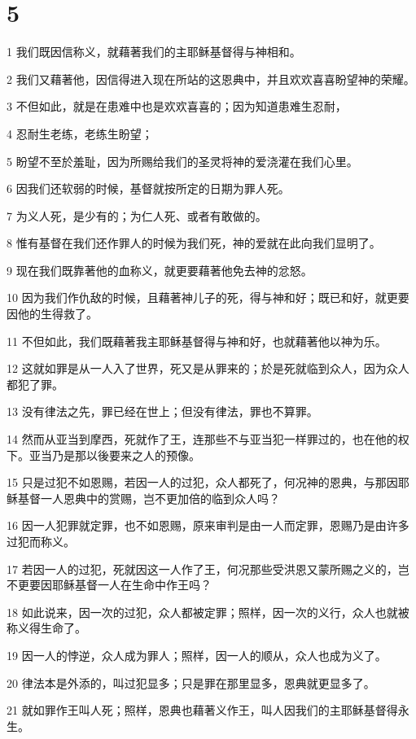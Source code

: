 \chapter{5}

\par 1 我们既因信称义，就藉著我们的主耶稣基督得与神相和。
\par 2 我们又藉著他，因信得进入现在所站的这恩典中，并且欢欢喜喜盼望神的荣耀。
\par 3 不但如此，就是在患难中也是欢欢喜喜的；因为知道患难生忍耐，
\par 4 忍耐生老练，老练生盼望；
\par 5 盼望不至於羞耻，因为所赐给我们的圣灵将神的爱浇灌在我们心里。
\par 6 因我们还软弱的时候，基督就按所定的日期为罪人死。
\par 7 为义人死，是少有的；为仁人死、或者有敢做的。
\par 8 惟有基督在我们还作罪人的时候为我们死，神的爱就在此向我们显明了。
\par 9 现在我们既靠著他的血称义，就更要藉著他免去神的忿怒。
\par 10 因为我们作仇敌的时候，且藉著神儿子的死，得与神和好；既已和好，就更要因他的生得救了。
\par 11 不但如此，我们既藉著我主耶稣基督得与神和好，也就藉著他以神为乐。
\par 12 这就如罪是从一人入了世界，死又是从罪来的；於是死就临到众人，因为众人都犯了罪。
\par 13 没有律法之先，罪已经在世上；但没有律法，罪也不算罪。
\par 14 然而从亚当到摩西，死就作了王，连那些不与亚当犯一样罪过的，也在他的权下。亚当乃是那以後要来之人的预像。
\par 15 只是过犯不如恩赐，若因一人的过犯，众人都死了，何况神的恩典，与那因耶稣基督一人恩典中的赏赐，岂不更加倍的临到众人吗？
\par 16 因一人犯罪就定罪，也不如恩赐，原来审判是由一人而定罪，恩赐乃是由许多过犯而称义。
\par 17 若因一人的过犯，死就因这一人作了王，何况那些受洪恩又蒙所赐之义的，岂不更要因耶稣基督一人在生命中作王吗？
\par 18 如此说来，因一次的过犯，众人都被定罪；照样，因一次的义行，众人也就被称义得生命了。
\par 19 因一人的悖逆，众人成为罪人；照样，因一人的顺从，众人也成为义了。
\par 20 律法本是外添的，叫过犯显多；只是罪在那里显多，恩典就更显多了。
\par 21 就如罪作王叫人死；照样，恩典也藉著义作王，叫人因我们的主耶稣基督得永生。

